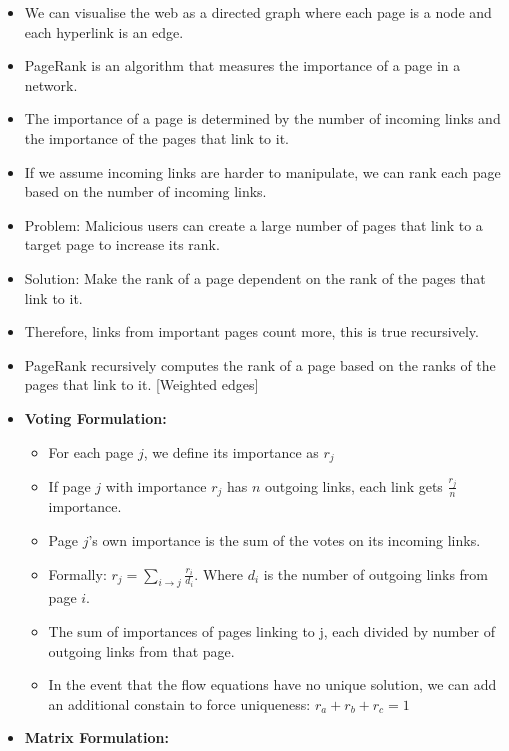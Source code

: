 \documentclass[10pt, landscape]{article}
\begin{document}
\begin{multicols*}{4}
\begin{itemize}
  \item We can visualise the web as a directed graph where each page is a node and each hyperlink is an edge.
  \item PageRank is an algorithm that measures the importance of a page in a network.
  \item The importance of a page is determined by the number of incoming links and the importance of the pages that link to it.
  \item If we assume incoming links are harder to manipulate, we can rank each page based on the number of incoming links.
  \item Problem: Malicious users can create a large number of pages that link to a target page to increase its rank.
  \item Solution: Make the rank of a page dependent on the rank of the pages that link to it.
  \item Therefore, links from important pages count more, this is true recursively.
  \item PageRank recursively computes the rank of a page based on the ranks of the pages that link to it. [Weighted edges]
  \item \textbf{Voting Formulation:}
        \begin{itemize}
          \item For each page $j$, we define its importance as $r_j$
          \item If page $j$ with importance $r_j$ has $n$ outgoing links, each link gets $\frac{r_j}{n}$ importance.
          \item Page $j$'s own importance is the sum of the votes on its incoming links.
          \item Formally: $r_j = \underset{i \rightarrow j}{\sum} \frac{r_i}{d_i}$. \newline Where $d_i$ is the number of outgoing links from page $i$.
          \item The sum of importances of pages linking to j, each divided by number of outgoing links from that page.
          \item In the event that the flow equations have no unique solution, we can add an additional constain to force uniqueness:\newline
                $r_a + r_b + r_c = 1$
        \end{itemize}
    \item \textbf{Matrix Formulation:}
          \begin{itemize}

\end{itemize}
\end{itemize}
\end{multicols*}
\end{document}

